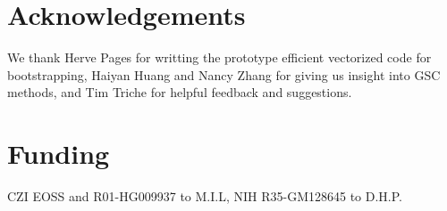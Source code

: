 \section*{Acknowledgements}
We thank Herve Pages for writting the prototype efficient vectorized code for bootstrapping, 
Haiyan Huang and Nancy Zhang for giving us insight into GSC methods, and Tim Triche for helpful feedback and suggestions.

\section*{Funding}
CZI EOSS and R01-HG009937 to M.I.L, NIH R35-GM128645 to D.H.P.


